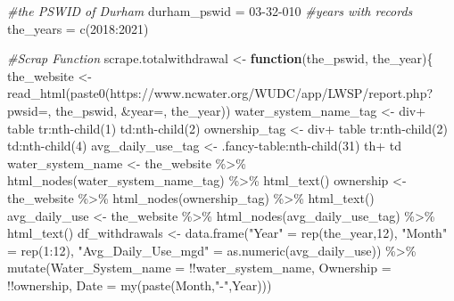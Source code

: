 \documentclass[
  12pt,
]{article}
\newenvironment{Shaded}{\begin{snugshade}}{\end{snugshade}}
\newcommand{\AttributeTok}[1]{\textcolor[rgb]{0.77,0.63,0.00}{#1}}
\newcommand{\CommentTok}[1]{\textcolor[rgb]{0.56,0.35,0.01}{\textit{#1}}}
\newcommand{\ControlFlowTok}[1]{\textcolor[rgb]{0.13,0.29,0.53}{\textbf{#1}}}
\newcommand{\DecValTok}[1]{\textcolor[rgb]{0.00,0.00,0.81}{#1}}
\newcommand{\FunctionTok}[1]{\textcolor[rgb]{0.00,0.00,0.00}{#1}}
\newcommand{\NormalTok}[1]{#1}
\newcommand{\OtherTok}[1]{\textcolor[rgb]{0.56,0.35,0.01}{#1}}
\newcommand{\SpecialCharTok}[1]{\textcolor[rgb]{0.00,0.00,0.00}{#1}}
\newcommand{\StringTok}[1]{\textcolor[rgb]{0.31,0.60,0.02}{#1}}
\begin{document}
\begin{Shaded}
\begin{Highlighting}[]
\CommentTok{\#the PSWID of Durham}
\NormalTok{durham\_pswid }\OtherTok{=} \StringTok{\textquotesingle{}03{-}32{-}010\textquotesingle{}}
\CommentTok{\#years with records}
\NormalTok{the\_years }\OtherTok{=} \FunctionTok{c}\NormalTok{(}\DecValTok{2018}\SpecialCharTok{:}\DecValTok{2021}\NormalTok{)}

\CommentTok{\#Scrap Function}
\NormalTok{scrape.totalwithdrawal }\OtherTok{\textless{}{-}} \ControlFlowTok{function}\NormalTok{(the\_pswid, the\_year)\{}
\NormalTok{the\_website }\OtherTok{\textless{}{-}} \FunctionTok{read\_html}\NormalTok{(}\FunctionTok{paste0}\NormalTok{(}\StringTok{\textquotesingle{}https://www.ncwater.org/WUDC/app/LWSP/report.php?pwsid=\textquotesingle{}}\NormalTok{,}
\NormalTok{the\_pswid, }\StringTok{\textquotesingle{}\&year=\textquotesingle{}}\NormalTok{, the\_year))}
\NormalTok{water\_system\_name\_tag }\OtherTok{\textless{}{-}} \StringTok{\textquotesingle{}div+ table tr:nth{-}child(1) td:nth{-}child(2)\textquotesingle{}}
\NormalTok{ownership\_tag }\OtherTok{\textless{}{-}} \StringTok{\textquotesingle{}div+ table tr:nth{-}child(2) td:nth{-}child(4)\textquotesingle{}}
\NormalTok{avg\_daily\_use\_tag }\OtherTok{\textless{}{-}} \StringTok{\textquotesingle{}.fancy{-}table:nth{-}child(31) th+ td\textquotesingle{}}
\NormalTok{water\_system\_name }\OtherTok{\textless{}{-}}\NormalTok{ the\_website }\SpecialCharTok{\%\textgreater{}\%} \FunctionTok{html\_nodes}\NormalTok{(water\_system\_name\_tag) }\SpecialCharTok{\%\textgreater{}\%} \FunctionTok{html\_text}\NormalTok{()}
\NormalTok{ownership }\OtherTok{\textless{}{-}}\NormalTok{ the\_website }\SpecialCharTok{\%\textgreater{}\%} \FunctionTok{html\_nodes}\NormalTok{(ownership\_tag) }\SpecialCharTok{\%\textgreater{}\%} \FunctionTok{html\_text}\NormalTok{()}
\NormalTok{avg\_daily\_use }\OtherTok{\textless{}{-}}\NormalTok{ the\_website }\SpecialCharTok{\%\textgreater{}\%} \FunctionTok{html\_nodes}\NormalTok{(avg\_daily\_use\_tag) }\SpecialCharTok{\%\textgreater{}\%} \FunctionTok{html\_text}\NormalTok{()}
\NormalTok{df\_withdrawals }\OtherTok{\textless{}{-}} \FunctionTok{data.frame}\NormalTok{(}\StringTok{"Year"} \OtherTok{=} \FunctionTok{rep}\NormalTok{(the\_year,}\DecValTok{12}\NormalTok{),}
\StringTok{"Month"} \OtherTok{=} \FunctionTok{rep}\NormalTok{(}\DecValTok{1}\SpecialCharTok{:}\DecValTok{12}\NormalTok{),}
\StringTok{"Avg\_Daily\_Use\_mgd"} \OtherTok{=} \FunctionTok{as.numeric}\NormalTok{(avg\_daily\_use)) }\SpecialCharTok{\%\textgreater{}\%}
\FunctionTok{mutate}\NormalTok{(}\AttributeTok{Water\_System\_name =} \SpecialCharTok{!!}\NormalTok{water\_system\_name,}
\AttributeTok{Ownership =} \SpecialCharTok{!!}\NormalTok{ownership,}
\AttributeTok{Date =} \FunctionTok{my}\NormalTok{(}\FunctionTok{paste}\NormalTok{(Month,}\StringTok{"{-}"}\NormalTok{,Year)))}
  

\end{Highlighting}
\end{Shaded}
\end{document}
